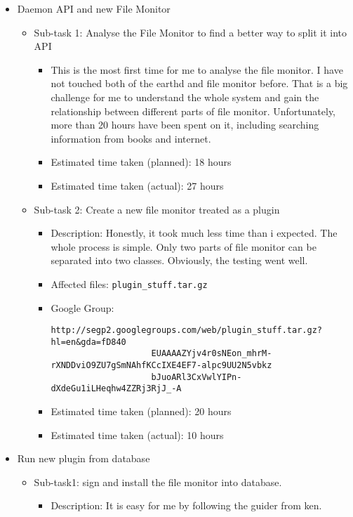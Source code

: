 \documentclass{article}
\begin{document}
\begin{itemize}
	\item Daemon API and new File Monitor
	     \begin{itemize}
	        \item Sub-task 1: Analyse the File Monitor to find a better way to split it into API
	           \begin{itemize}
					\item This is the most first time for me to analyse the file monitor. I have not touched both of the earthd and file monitor before. That is a big challenge for me to understand the whole system and gain the relationship between different parts of file monitor. Unfortunately, more than 20 hours have been spent on it, including searching information from books and internet. 
					\item Estimated time taken (planned): 18 hours
					\item Estimated time taken (actual): 27 hours
				\end{itemize}
			\item Sub-task 2: Create a new file monitor treated as a plugin
			   \begin{itemize}
					\item Description: Honestly, it took much less time than i expected. The whole process is simple. Only two parts of file monitor can be separated into two classes. Obviously, the testing went well.
					\item Affected files: \texttt{plugin\_stuff.tar.gz} 
					\item Google Group: \begin{verbatim}http://segp2.googlegroups.com/web/plugin_stuff.tar.gz?hl=en&gda=fD840
					EUAAAAZYjv4r0sNEon_mhrM-rXNDDviO9ZU7gSmNAhfKCcIXE4EF7-alpc9UU2N5vbkz
					bJuoARl3CxVwlYIPn-dXdeGu1iLHeqhw4ZZRj3RjJ_-A\end{verbatim}
					\item Estimated time taken (planned): 20 hours
					\item Estimated time taken (actual): 10 hours
				\end{itemize}
	     \end{itemize}
	\item Run new plugin from database
	     \begin{itemize}
	         \item Sub-task1: sign and install the file monitor into database.
	            \begin{itemize}
							\item Description: It is easy for me by following the guider from ken. 

\end{itemize}
\end{itemize}
\end{itemize}
\end{document}
